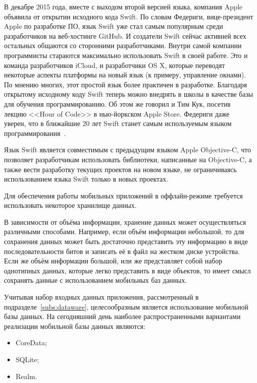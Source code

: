 В декабре 2015 года, вместе с выходом второй версией языка, компания Apple
объявила от открытии исходного кода Swift.
По словам Федериги, вице-президент Apple по разработке ПО, язык Swift уже
стал самым популярным среди разработчиков на веб-хостинге GitHub.
И создатели Swift сейчас активней всех остальных общаются со сторонними разработчиками.
Внутри самой компании программисты стараются максимально использовать Swift
в своей работе. Это и команда разработчиков iCloud, и разработчики OS X,
которые переводят некоторые аспекты платформы на новый язык (к примеру,
управление окнами). По мнению многих, этот простой язык более практичен в разработке.
Благодаря открытому исходному коду Swift теперь можно внедрять
в школы в качестве базы для обучения программированию. Об этом же говорил
и Тим Кук, посетив лекцию <<Hour of Code>> в нью-йоркском Apple Store.
Федериги даже уверен, что в ближайшие 20 лет Swift станет самым
используемым языком программирования~\cite{federighi_about_swift, habr_swift}.

Язык Swift является совместимым с предыдущим языком Apple Objective-C,
что позволяет разработчикам использовать библиотеки, написанные на Objective-C,
а также вести разработку текущих проектов на новом языке, не ограничиваясь
использованием языка Swift только в новых проектах.

Для обеспечения работы мобильных приложений в оффлайн-режиме требуется
использовать некоторое хранилище данных.

В зависимости от объёма информации, хранение данных может осуществляться
различными способами. Например, если объём информации небольшой, то для
сохранения данных может быть достаточно представить эту информацию
в виде последовательности битов и записать её в файл на жестком диске устройства.
Если же объём информации большой, или же представляет собой набор однотипных данных,
которые легко представить в виде объектов, то имеет смысл сохранять данные
с использованием мобильных баз данных.

Учитывая набор входных данных приложения, рассмотренный в подразделе~\ref{subs:dataware},
целесообразным является использование мобильной базы данных. На сегодняшний день
наиболее распространенными вариантами реализации мобильной базы данных являются:
\begin{itemize}
  \item CoreData;
  \item SQLite;
  \item Realm.
\end{itemize}

